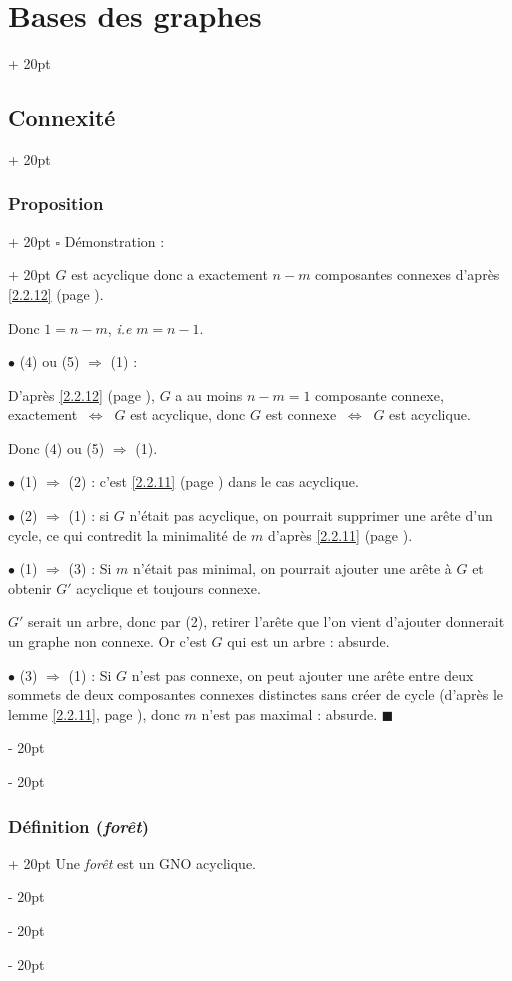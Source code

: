 \documentclass[a4paper, 12pt, twoside]{article}
\newcommand{\ssi}{\ \Leftrightarrow \ }
\newcommand{\ind}[1][20pt]{\advance\leftskip + #1}
\newcommand{\deind}[1][20pt]{\advance\leftskip - #1}
\newenvironment{indt}[2][20pt]{#2 \par \ind[#1]}{\par \deind} %
\begin{document}
\begin{indt}{\section{Bases des graphes}}
\begin{indt}{\subsection{Connexité}}
\begin{indt}{\subsubsection{Proposition}}
\begin{indt}{$\square$ Démonstration :}
                    $G$ est acyclique donc a exactement $n - m$ composantes connexes d'après \ref{2.2.12} (page \pageref{2.2.12}).

                    Donc $1 = n - m$, \textit{i.e} $m = n - 1$.

                    $\bullet$ (4) ou (5) $\Rightarrow$ (1) :

                    D'après \ref{2.2.12} (page \pageref{2.2.12}), $G$ a au moins $n - m = 1$ composante connexe, exactement $\ssi$ $G$ est acyclique, donc $G$ est connexe $\ssi$ $G$ est acyclique.

                    Donc (4) ou (5) $\Rightarrow$ (1).

                    \vspace{12pt}
                    
                    $\bullet$ (1) $\Rightarrow$ (2) : c'est \ref{2.2.11} (page \pageref{2.2.11}) dans le cas acyclique.

                    $\bullet$ (2) $\Rightarrow$ (1) : si $G$ n'était pas acyclique, on pourrait supprimer une arête d'un cycle, ce qui contredit la minimalité de $m$ d'après \ref{2.2.11} (page \pageref{2.2.11}).

                    \vspace{12pt}
                    
                    $\bullet$ (1) $\Rightarrow$ (3) : Si $m$ n'était pas minimal, on pourrait ajouter une arête à $G$ et obtenir $G'$ acyclique et toujours connexe.

                    $G'$ serait un arbre, donc par (2), retirer l'arête que l'on vient d'ajouter donnerait un graphe non connexe. Or c'est $G$ qui est un arbre : absurde.

                    $\bullet$ (3) $\Rightarrow$ (1) : Si $G$ n'est pas connexe, on peut ajouter une arête entre deux sommets de deux composantes connexes distinctes sans créer de cycle (d'après le lemme \ref{2.2.11}, page \pageref{2.2.11}), donc $m$ n'est pas maximal : absurde. $\blacksquare$
                \end{indt}
            \end{indt}

            \vspace{12pt}
            
            \begin{indt}{\subsubsection{Définition (\textit{forêt})}}
                Une \textit{forêt} est un GNO acyclique.
            \end{indt}


\end{indt}
\end{indt}
\end{document}
